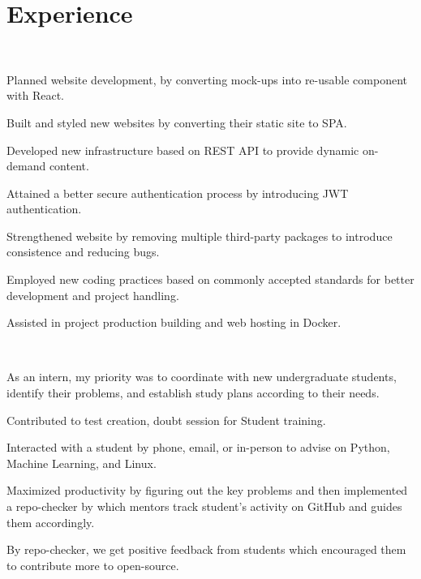 \documentclass[]{Kushagra-build}
\begin{document}
\begin{minipage}[t]{0.70\textwidth} 

\section{Experience}

\\
\vspace{0.9em} %
\begin{tightenumerate}
    \item Planned website development, by converting mock-ups into re-usable component with React.
    \item Built and styled new websites by converting their static site to SPA.
    \item Developed new infrastructure based on REST API to provide dynamic on-demand content.
    \item Attained a better secure authentication process by introducing JWT authentication.
    \item Strengthened website by removing multiple third-party packages to introduce consistence and reducing bugs.
    \item Employed new coding practices based on commonly accepted standards for better development and project handling.
    \item Assisted in project production building and web hosting in Docker.
\end{tightenumerate}
\sectionsep

 \\
\begin{tightenumerate}
    \item As an intern, my priority was to coordinate with new undergraduate students, identify their problems, and establish study plans according to their needs.
    \item Contributed to test creation, doubt session for Student training.
    \item Interacted with a student by phone, email, or in-person to advise on Python, Machine Learning, and Linux.
    \item Maximized productivity by figuring out the key problems and then implemented a repo-checker by which mentors track student's activity on GitHub and guides them accordingly.
    \item By repo-checker, we get positive feedback from students which encouraged them to contribute more to open-source.
\end{tightenumerate}
\sectionsep


\end{minipage}
\end{document}
